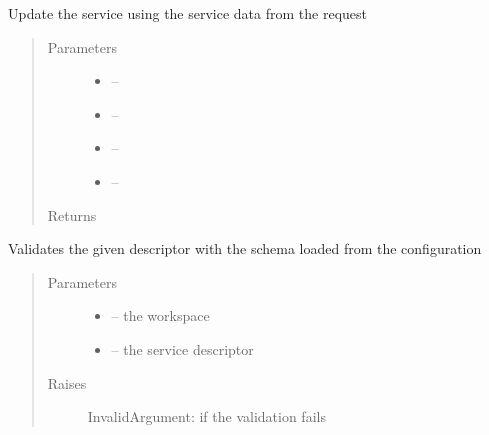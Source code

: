 \documentclass[letterpaper,10pt,english]{sphinxmanual}
\begin{document}
\begin{fulllineitems}
\label{_source/son_editor.impl:son_editor.impl.servicesimpl.update_service}
Update the service using the service data from the request
\begin{quote}\begin{description}
\item[{Parameters}] \leavevmode\begin{itemize}
\item {} 
 -- 

\item {} 
 -- 

\item {} 
 -- 

\item {} 
 -- 

\end{itemize}

\item[{Returns}] \leavevmode


\end{description}\end{quote}

\end{fulllineitems}


\begin{fulllineitems}
\label{_source/son_editor.impl:son_editor.impl.servicesimpl.validate_service_descriptor}
Validates the given descriptor with the schema loaded from the configuration
\begin{quote}\begin{description}
\item[{Parameters}] \leavevmode\begin{itemize}
\item {} 
 -- the workspace

\item {} 
 -- the service descriptor

\end{itemize}

\item[{Raises}] \leavevmode
InvalidArgument: if the validation fails

\end{description}\end{quote}

\end{fulllineitems}
\end{document}
